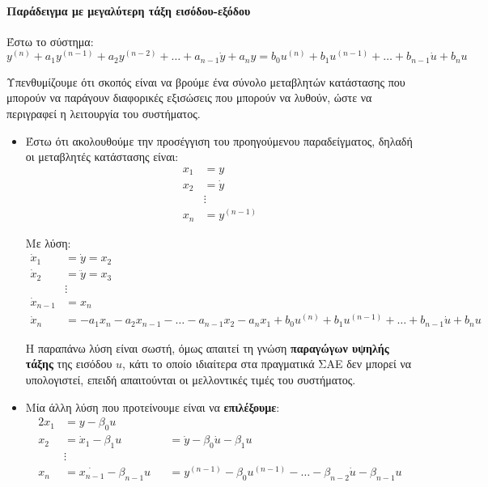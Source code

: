 \documentclass[11pt,a4paper,notitlepage,fleqn]{article}
\begin{document}
\paragraph{Παράδειγμα με μεγαλύτερη τάξη εισόδου-εξόδου}
\label{sec:nontd_highorder_system}
Έστω το σύστημα:
\[
y^{(n)} + a_1y^{(n-1)} + a_2y^{(n-2)} + \dots + a_{n-1}\dot y + a_n y =
b_0 u^{(n)} + b_1u^{(n-1)} + \dots + b_{n-1}\dot u + b_n u
\label{eq:nontd_highorder_system}
\]

Υπενθυμίζουμε ότι σκοπός είναι να βρούμε ένα σύνολο μεταβλητών κατάστασης που μπορούν
να παράγουν διαφορικές εξισώσεις που μπορούν να λυθούν, ώστε να περιγραφεί η λειτουργία του
συστήματος.

\begin{itemize}
	\item Έστω ότι ακολουθούμε την προσέγγιση του προηγούμενου παραδείγματος, δηλαδή οι
	μεταβλητές κατάστασης είναι:
	\begin{align*}
	x_1 &= y \\
	x_2 &= \dot y \\
	&\vdots \\
	x_n &= y^{(n-1)}
	\end{align*}

	Με λύση:
	\begin{align*}
	\dot x_1 &= \dot y = x_2\\
	\dot x_2 &= \ddot y = x_3 \\
	&\vdots \\
	\dot x_{n-1} &= x_n\\
	\dot x_n &= -a_1x_n -a_2x_{n-1} - \dots - a_{n-1}x_2 -a_nx_1 + b_0 u^{(n)} + b_1u^{(n-1)} + \dots + b_{n-1}\dot u + b_n u
	\end{align*}

     Η παραπάνω λύση είναι σωστή, όμως απαιτεί τη γνώση \textbf{παραγώγων υψηλής τάξης} της
     εισόδου \( u \), κάτι το οποίο ιδιαίτερα στα πραγματικά ΣΑΕ δεν μπορεί να υπολογιστεί,
     επειδή απαιτούνται οι μελλοντικές τιμές του συστήματος.
     \item Μία άλλη λύση που προτείνουμε είναι να \textbf{επιλέξουμε}:
     \begin{alignat*}{2}
     	x_1 &= y - \beta_0 u && \\
     	x_2 &= \dot x_1 - \beta_1 u &&= \dot y - \beta_0\dot u - \beta_1u \\
     	&\vdots && \\
     	x_n &= \dot{x_{n-1}} - \beta_{n-1}u
     	&&= y^{(n-1)} - \beta_0u^{(n-1)} - \dots - \beta_{n-2}\dot u - \beta_{n-1}u
     \end{alignat*}


\end{itemize}
\end{document}
